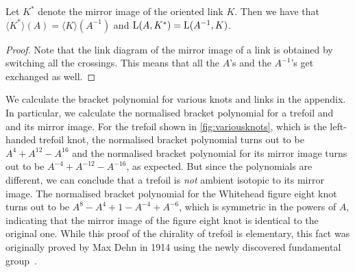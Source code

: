 \begin{thm}
	Let \(K^*\) denote the mirror image of the oriented link \(K\). Then we have that \(\langle K^*\rangle (A) = \langle K\rangle(A^{-1})\) and \(\operatorname{L}(A, K^*) = \operatorname{L}(A^{-1}, K)\).
\end{thm}
\begin{proof}
	Note that the link diagram of the mirror image of a link is obtained by switching all the crossings. This means that all the \(A\)'s and the \(A^{-1}\)'s get exchanged as well.
\end{proof}

We calculate the bracket polynomial for various knots and links in the appendix. In particular, we calculate the normalised bracket polynomial for a trefoil and and its mirror image. For the trefoil shown in \cref{fig:variousknots}, which is the left-handed trefoil knot, the normalised bracket polynomial turns out to be \(A^4 + A^{12} - A^{16}\) and the normalised bracket polynomial for its mirror image turns out to be \(A^{-4} + A^{-12} - A^{-16}\), as expected. But since the polynomials are different, we can conclude that a trefoil is \textit{not} ambient isotopic to its mirror image. The normalised bracket polynomial for the Whitehead figure eight knot turns out to be \(A^8 - A^4 + 1 - A^{-4} + A^{-6}\), which is symmetric in the powers of \(A\), indicating that the mirror image of the figure eight knot is identical to the original one. While this proof of the chirality of trefoil is elementary, this fact was originally proved by Max Dehn in 1914 using the newly discovered fundamental group~\cite[p.~200]{dehn}.



